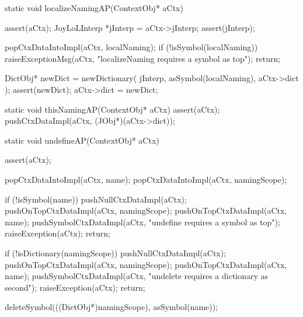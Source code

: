 \startCCode
static void localizeNamingAP(ContextObj* aCtx) {
  assert(aCtx);
  JoyLoLInterp *jInterp = aCtx->jInterp;
  assert(jInterp);
  
  popCtxDataIntoImpl(aCtx, localNaming);
  if (!isSymbol(localNaming)){
    raiseExceptionMsg(aCtx,
      "localizeNaming requires a symbol as top");
    return;
  }
  
  DictObj* newDict = 
    newDictionary(
      jInterp,
      asSymbol(localNaming),
      aCtx->dict
    );
  assert(newDict);
  aCtx->dict = newDict;
}
\stopCCode

\startCCode
static void thisNamingAP(ContextObj* aCtx) {
  assert(aCtx);
  pushCtxDataImpl(aCtx, (JObj*)(aCtx->dict));
}
\stopCCode

\startCCode
static void undefineAP(ContextObj* aCtx) {
  assert(aCtx);
  
  popCtxDataIntoImpl(aCtx, name);
  popCtxDataIntoImpl(aCtx, namingScope);
  
  if (!isSymbol(name)) {
    pushNullCtxDataImpl(aCtx);
    pushOnTopCtxDataImpl(aCtx, namingScope);
    pushOnTopCtxDataImpl(aCtx, name);
    pushSymbolCtxDataImpl(aCtx,
      "undefine requires a symbol as top");
    raiseException(aCtx);
    return;
  }
  
  if (!isDictionary(namingScope)) {
    pushNullCtxDataImpl(aCtx);
    pushOnTopCtxDataImpl(aCtx, namingScope);
    pushOnTopCtxDataImpl(aCtx, name);
    pushSymbolCtxDataImpl(aCtx,
      "undelete requires a dictionary as second");
    raiseException(aCtx);
    return;
  }
  
  deleteSymbol(((DictObj*)namingScope), asSymbol(name));
  }
\stopCCode

